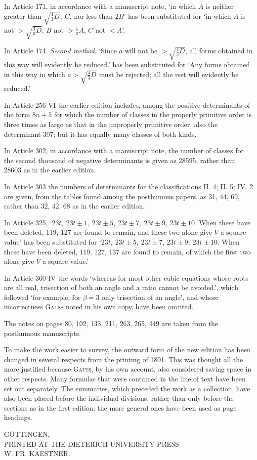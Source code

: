 In Article 171, in accordance with a manuscript note, ‘in which \(A\) is neither greater than \(\surd{\frac43D},\allowbreak\ C\), nor less than \(2B\)’ has been substituted for ‘in which \(A\) is not \(>\surd{\frac43D}\), \(B\) not \(>\frac12A\), \(C\) not \(<A\)’.

In Article 174. \textit{Second method.} ‘Since \(a\) will not be \(>\surd{\frac43D}\), all forms obtained in this way will evidently be reduced.’ has been substituted for ‘Any forms obtained in this way in which \(a>\surd{\frac43D}\) must be rejected; all the rest will evidently be reduced.’

In Article 256 VI the earlier edition includes, among the positive determinants of the form \(8n+5\) for which the number of classes in the properly primitive order is three times as large as that in the improperly primitive order, also the determinant 397; but it has equally many classes of both kinds.

In Article 302, in accordance with a manuscript note, the number of classes for the second thousand of negative determinants is given as 28595, rather than 28603 as in the earlier edition.

In Article 303 the numbers of determinants for the classifications II. 4; II. 5; IV. 2 are given, from the tables found among the posthumous papers, as 31, 44, 69, rather than 32, 42, 68 as in the earlier edition.

In Article 325, ‘\(23t,\allowbreak\ 23t\pm1,\allowbreak\ 23t\pm5,\allowbreak\ 23t\pm7,\allowbreak\ 23t\pm9,\allowbreak\ 23t\pm10\). When these have been deleted, 119, 127 are found to remain, and these two alone give \(V\) a square value’ has been substituted for ‘\(23t,\allowbreak\ 23t\pm5,\allowbreak\ 23t\pm7\), \(23t\pm9,\allowbreak\ 23t\pm10\). When these have been deleted, 119, 127, 137 are found to remain, of which the first two alone give \(V\) a square value.’

In Article 360 IV the words ‘whereas for most other cubic equations whose roots are all real, trisection of both an angle and a ratio cannot be avoided.’, which followed ‘for example, for \(\beta=3\) only trisection of an angle’, and whose incorrectness \textsc{Gauss} noted in his own copy, have been omitted.

The notes on pages 80, 102, 133, 211, 263, 265, 449 are taken from the posthumous manuscripts.

To make the work easier to survey, the outward form of the new edition has been changed in several respects from the printing of 1801. This was thought all the more justified because \textsc{Gauss}, by his own account, also considered saving space in other respects. Many formulas that were contained in the line of text have been set out separately. The summaries, which preceded the work as a collection, have also been placed before the individual divisions, rather than only before the sections as in the first edition; the more general ones have been used as page headings.

\BookRule{45mm}

\begin{center}\small GÖTTINGEN,\\ PRINTED AT THE DIETERICH UNIVERSITY PRESS\\ W. FR. KAESTNER.\end{center}
